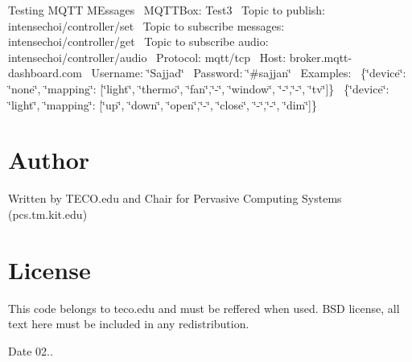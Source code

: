 Testing M\+Q\+TT M\+Essages~\newline
M\+Q\+T\+T\+Box\+: Test3~\newline
Topic to publish\+: intensechoi/controller/set~\newline
Topic to subscribe messages\+: intensechoi/controller/get~\newline
Topic to subscribe audio\+: intensechoi/controller/audio~\newline
Protocol\+: mqtt/tcp~\newline
Host\+: broker.\+mqtt-\/dashboard.\+com~\newline
Username\+: \char`\"{}\+Sajjad\char`\"{}~\newline
Password\+: \char`\"{}\#sajjan\char`\"{}~\newline
Examples\+:~\newline
 \{\char`\"{}device\char`\"{}\+: \char`\"{}none\char`\"{}, \char`\"{}mapping\char`\"{}\+: \mbox{[}\char`\"{}light\char`\"{}, \char`\"{}thermo\char`\"{}, \char`\"{}fan\char`\"{},\char`\"{}-\/\char`\"{}, \char`\"{}window\char`\"{}, \char`\"{}-\/\char`\"{},\char`\"{}-\/\char`\"{}, \char`\"{}tv\char`\"{}\mbox{]}\}~\newline
 \{\char`\"{}device\char`\"{}\+: \char`\"{}light\char`\"{}, \char`\"{}mapping\char`\"{}\+: \mbox{[}\char`\"{}up\char`\"{}, \char`\"{}down\char`\"{}, \char`\"{}open\char`\"{},\char`\"{}-\/\char`\"{}, \char`\"{}close\char`\"{}, \char`\"{}-\/\char`\"{},\char`\"{}-\/\char`\"{}, \char`\"{}dim\char`\"{}\mbox{]}\}~\newline
 \hypertarget{index_author}{}\section{Author}\label{index_author}
Written by T\+E\+C\+O.\+edu and Chair for Pervasive Computing Systems (pcs.\+tm.\+kit.\+edu)\hypertarget{index_license}{}\section{License}\label{index_license}
This code belongs to teco.\+edu and must be reffered when used. B\+SD license, all text here must be included in any redistribution.

\begin{DoxyDate}{Date}
02.. 
\end{DoxyDate}

